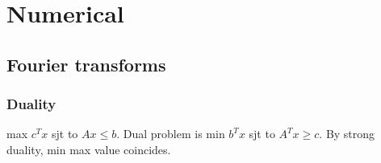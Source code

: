 \chapter{Numerical}
\section{Fourier transforms}
\iffalse
\subsection{General linear recurrences}
  If $a_n = \sum_{k=0}^{n-1} a_k b_{n-k}$, then $A(x) = \frac{a_0}{1-B(x)}$.

\subsection{Inverse polynomial modulo $x^l$}
  Given $A(x)$, find $B(x)$ such that $A(x)B(x) = 1 + x^l Q(x)$ for some $Q(x)$.

  Step 1: Start with $B_0(x) = 1/a_0$

  Step 2: $B_{k+1}(x) = (-B_k(x)^2 A(x) + 2 B_k(x)) \mod x^{2^{k+1}}$.

\subsection{Fast subset convolution}
  Given array $a_i$ of size $2^k$ calculate $b_i = \sum_{j \BitAnd i = i} a_j$.
\fi

\subsection{Duality}
  max $c^Tx$ sjt to $Ax \leq b$. Dual problem is min $b^Tx$ sjt to $A^Tx \geq c$. By strong duality, min max value coincides.\\

